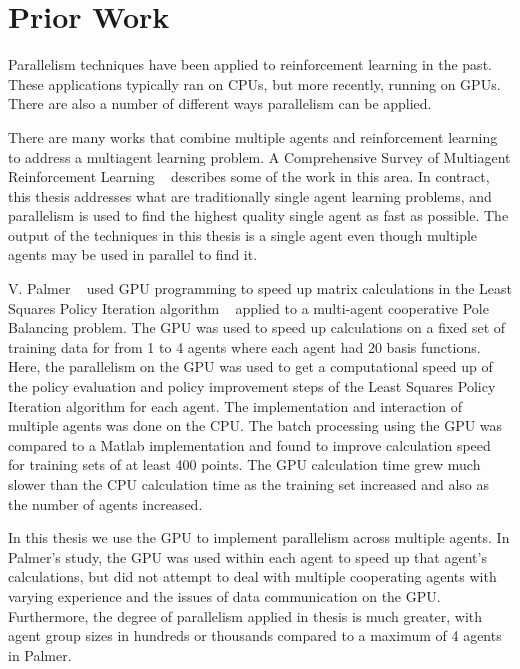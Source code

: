 \section{Prior Work}

Parallelism techniques have been applied to reinforcement learning in the past.  These applications typically ran on CPUs, but more recently, running on GPUs.  There are also a number of different ways parallelism can be applied.

There are many works that combine multiple agents and reinforcement learning to address a multiagent learning problem.  A Comprehensive Survey of Multiagent Reinforcement Learning ~\cite{Busoniu:2008p4935} describes some of the work in this area.  In contract, this thesis addresses what are traditionally single agent learning problems, and parallelism is used to find the highest quality single agent as fast as possible.  The output of the techniques in this thesis is a single agent even though multiple agents may be used in parallel to find it.

V. Palmer ~\cite{Palmer:2007p4912} used GPU programming to speed up matrix calculations in the Least Squares Policy Iteration algorithm ~\cite{Lagoudakis:2003p4913} applied to a multi-agent cooperative Pole Balancing problem.  The GPU was used to speed up calculations on a fixed set of training data for from 1 to 4 agents where each agent had 20 basis functions.  Here, the parallelism on the GPU was used to get a computational speed up of the policy evaluation and policy improvement steps of the Least Squares Policy Iteration algorithm for each agent.  The implementation and interaction of multiple agents was done on the CPU.  The batch processing using the GPU was compared to a Matlab implementation and found to improve calculation speed for training sets of at least 400 points.  The GPU calculation time grew much slower than the CPU calculation time as the training set increased and also as the number of agents increased.

In this thesis we use the GPU to implement parallelism across multiple agents.  In Palmer’s study, the GPU was used within each agent to speed up that agent’s calculations, but did not attempt to deal with multiple cooperating agents with varying experience and the issues of data communication on the GPU.  Furthermore, the degree of parallelism applied in thesis is much greater, with agent group sizes in hundreds or thousands compared to a maximum of 4 agents in Palmer.

